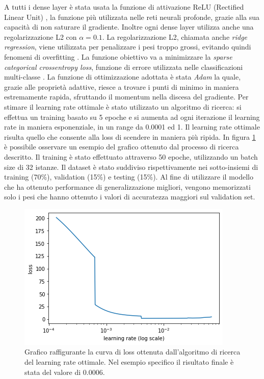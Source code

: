 \documentclass[11pt]{report}
\begin{document}
A tutti i dense layer è stata usata la funzione di attivazione ReLU (Rectified Linear Unit) \cite{relu}, la funzione più utilizzata nelle reti neurali profonde, grazie alla sua capacità di non saturare il gradiente. Inoltre ogni dense layer utilizza anche una regolarizzazione L2 con $\alpha = 0.1$. La regolarizzazione L2, chiamata anche \textit{ridge regression}, viene utilizzata per penalizzare i pesi troppo grossi, evitando quindi fenomeni di overfitting \cite{l1l2}. La funzione obiettivo va a minimizzare la \textit{sparse categorical crossentropy loss}, funzione di errore utilizzata nelle classificazioni multi-classe \cite{loss}.
La funzione di ottimizzazione adottata è stata \textit{Adam} \cite{kingma2014adam} la quale, grazie alle proprietà adattive, riesce a trovare i punti di minimo in maniera estremamente rapida, sfruttando il momentum nella discesa del gradiente. Per stimare il learning rate ottimale è stato utilizzato un algoritmo di ricerca: si effettua un training basato su 5 epoche e si aumenta ad ogni iterazione il learning rate in maniera esponenziale, in un range da 0.0001 ed 1. Il learning rate ottimale risulta quello che consente alla loss di scendere in maniera più ripida. In figura \ref{fig:lr-find} è possibile osservare un esempio del grafico ottenuto dal processo di ricerca descritto. Il training è stato effettuato attraverso 50 epoche, utilizzando un batch size di 32 istanze. Il dataset è stato suddiviso rispettivamente nei sotto-insiemi di training (70\%), validation (15\%) e testing (15\%). Al fine di utilizzare il modello che ha ottenuto performance di generalizzazione migliori, vengono memorizzati solo i pesi che hanno ottenuto i valori di accuratezza maggiori sul validation set. 



\begin{figure}[h]
    \centering
    \includegraphics[scale=0.65]{img/lr-finder.png}
    \caption{Grafico raffigurante la curva di loss ottenuta dall'algoritmo di ricerca del learning rate ottimale. Nel esempio specifico il risultato finale è stata del valore di 0.0006.}
    \label{fig:lr-find}
\end{figure}
\end{document}
